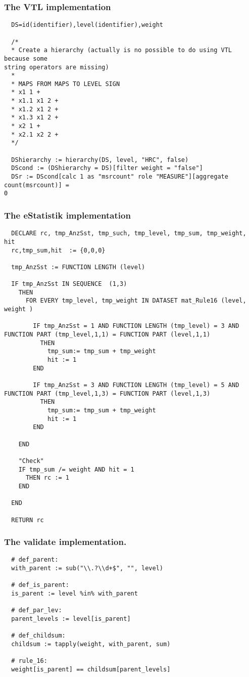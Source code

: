 \subsubsection*{The VTL implementation}
\begin{verbatim}
  DS=id(identifier),level(identifier),weight

  /*
  * Create a hierarchy (actually is no possible to do using VTL because some
string operators are missing)
  *
  * MAPS FROM MAPS TO LEVEL SIGN
  * x1 1 +
  * x1.1 x1 2 +
  * x1.2 x1 2 +
  * x1.3 x1 2 +
  * x2 1 +
  * x2.1 x2 2 +
  */

  DShierarchy := hierarchy(DS, level, "HRC", false)
  DScond := (DShierarchy = DS)[filter weight = "false"]
  DSr := DScond[calc 1 as "msrcount" role "MEASURE"][aggregate count(msrcount)] =
0
\end{verbatim}
\subsubsection*{The eStatistik implementation}
\begin{verbatim}
  DECLARE rc, tmp_AnzSst, tmp_such, tmp_level, tmp_sum, tmp_weight, hit
  rc,tmp_sum,hit  := {0,0,0}

  tmp_AnzSst := FUNCTION LENGTH (level)

  IF tmp_AnzSst IN SEQUENCE  (1,3)
    THEN 
      FOR EVERY tmp_level, tmp_weight IN DATASET mat_Rule16 (level, weight )

        IF tmp_AnzSst = 1 AND FUNCTION LENGTH (tmp_level) = 3 AND FUNCTION PART (tmp_level,1,1) = FUNCTION PART (level,1,1) 
          THEN
            tmp_sum:= tmp_sum + tmp_weight  
            hit := 1
        END

        IF tmp_AnzSst = 3 AND FUNCTION LENGTH (tmp_level) = 5 AND FUNCTION PART (tmp_level,1,3) = FUNCTION PART (level,1,3) 
          THEN
            tmp_sum:= tmp_sum + tmp_weight  
            hit := 1
        END

    END

    "Check"
    IF tmp_sum /= weight AND hit = 1
      THEN rc := 1
    END

  END

  RETURN rc
\end{verbatim}
\subsubsection*{The validate implementation.}
\begin{verbatim}
  # def_parent:
  with_parent := sub("\\.?\\d+$", "", level)

  # def_is_parent:
  is_parent := level %in% with_parent

  # def_par_lev:
  parent_levels := level[is_parent]

  # def_childsum:
  childsum := tapply(weight, with_parent, sum)

  # rule_16:
  weight[is_parent] == childsum[parent_levels]
\end{verbatim}


